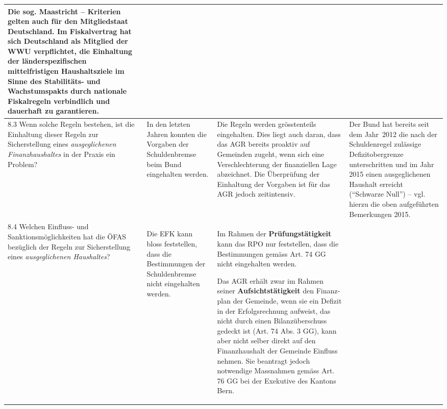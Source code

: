 \documentclass[10pt]{article}
\begin{document}
\begin{landscape}
\begin{center}
\begin{longtable}{|p{4cm}|p{5cm}|p{7.5cm}|p{7.5cm}|}
Die sog. Maastricht -- Kriterien gelten auch für den Mitgliedstaat Deutschland. Im Fiskalvertrag hat sich Deutschland als Mitglied der WWU verpflichtet, die Einhaltung der länderspezifischen mittelfristigen Haushaltsziele im Sinne des Stabilitäts- und Wachstumspakts durch nationale Fiskalregeln verbindlich und dauerhaft zu garantieren.

 \\
\hline
8.3 Wenn solche Regeln bestehen, ist die Einhaltung dieser Regeln zur Sicherstellung eines \textit{ausgeglichenen Finanzhaushaltes} in der Praxis ein Problem? & In den letzten Jahren konnten die Vorgaben der Schuldenbremse beim Bund eingehalten werden. & Die Regeln werden grösstenteils eingehalten. Dies liegt auch daran, dass das AGR bereits proaktiv auf Gemeinden zugeht, wenn sich eine Verschlechterung der finanziellen Lage abzeichnet. Die Überprüfung der Einhaltung der Vorgaben ist für das AGR jedoch zeitintensiv. & Der Bund hat bereits seit dem Jahr~2012 die nach der Schuldenregel zulässige Defizitobergrenze unterschritten und im Jahr 2015 einen ausgeglichenen Haushalt erreicht (“{}Schwarze Null”{}) -- vgl. hierzu die oben aufgeführten Bemerkungen 2015. \\
\hline
8.4 Welchen Einfluss- und Sanktionsmöglichkeiten hat die ÖFAS bezüglich der Regeln zur Sicherstellung eines \textit{ausgeglichenen Haushaltes}?  & Die EFK kann bloss feststellen, dass die Bestimmungen der Schuldenbremse nicht eingehalten werden.

\textit{~}

 & Im Rahmen der \textbf{Prüfungstätigkeit} kann das RPO nur feststellen, dass die Bestimmungen gemäss Art. 74 GG nicht eingehalten werden.

Das AGR erhält zwar im Rahmen seiner \textbf{Aufsichtstätigkeit} den Finanz­plan der Gemeinde, wenn sie ein Defizit in der Erfolgs­rechnung aufweist, das nicht durch einen Bilanzüberschuss gedeckt ist (Art. 74 Abs. 3 GG), kann aber nicht selber direkt auf den Finanzhaushalt der Gemeinde Einfluss nehmen. Sie beantragt jedoch notwendige Massnahmen gemäss Art. 76 GG bei der Exekutive des Kantons Bern.


\end{longtable}
\end{center}
\end{landscape}
\end{document}
